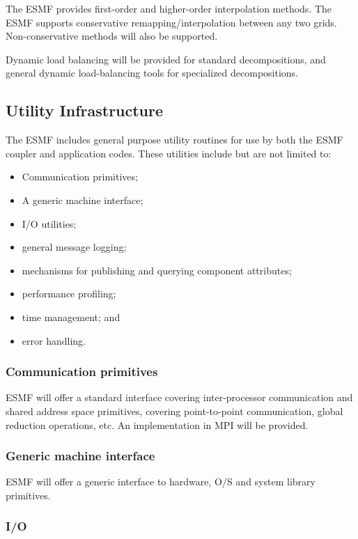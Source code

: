 The ESMF provides first-order and higher-order interpolation 
methods.  The ESMF supports conservative remapping/interpolation 
between any two grids. Non-conservative methods will also 
be supported.

Dynamic load balancing will be provided for standard decompositions, 
and general dynamic load-balancing tools for specialized decompositions.

\subsection{Utility Infrastructure}

The ESMF includes general purpose utility routines for use by both 
the ESMF coupler and application codes.  These utilities include 
but are not limited to:
\begin{itemize}
\item Communication primitives;
\item A generic machine interface;
\item I/O utilities;
\item general message logging;
\item mechanisms for publishing and querying component attributes;
\item performance profiling;
\item time management; and
\item error handling.
\end{itemize}

\subsubsection{Communication primitives}

ESMF will offer a standard interface covering inter-processor
communication and shared address space primitives, covering
point-to-point communication, global reduction operations, etc. An
implementation in MPI will be provided.

\subsubsection{Generic machine interface}

ESMF will offer a generic interface to hardware, O/S and system
library primitives.

\subsubsection{I/O}

